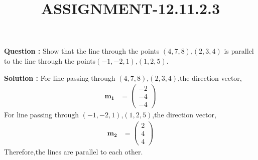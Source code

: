 \documentclass[12pt]{article}
\providecommand{\brak}[1]{\ensuremath{\left(#1\right)}}
\providecommand{\myvec}[1]{\ensuremath{\begin{pmatrix}#1\end{pmatrix}}}
\let\vec\mathbf
\begin{document}
\title{\textbf{ASSIGNMENT-12.11.2.3}}
\date{}
\maketitle
\textbf{Question :} Show that the line through the points \brak{4,7,8},\brak{2,3,4} is parallel to the line through the points\brak{-1,-2,1},\brak{1,2,5}.

\textbf{Solution :}
For line passing through \brak{4,7,8},\brak{2,3,4},the direction vector,\begin{align}
    \vec{m_1}&=\myvec{-2\\-4\\-4}
\end{align}
For line passing through \brak{-1,-2,1},\brak{1,2,5},the direction vector,\begin{align}
    \vec{m_2}&=\myvec{2\\4\\4}
\end{align}
Therefore,the lines are parallel to each other.
\end{document}
